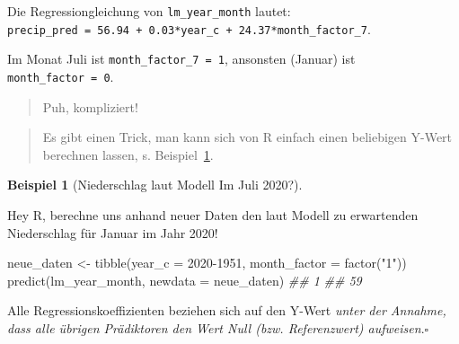 \documentclass[
  letterpaper,
]{scrbook}
\newenvironment{Shaded}{\begin{snugshade}}{\end{snugshade}}
\newcommand{\AttributeTok}[1]{\textcolor[rgb]{0.40,0.45,0.13}{#1}}
\newcommand{\DecValTok}[1]{\textcolor[rgb]{0.68,0.00,0.00}{#1}}
\newcommand{\DocumentationTok}[1]{\textcolor[rgb]{0.37,0.37,0.37}{\textit{#1}}}
\newcommand{\FunctionTok}[1]{\textcolor[rgb]{0.28,0.35,0.67}{#1}}
\newcommand{\NormalTok}[1]{\textcolor[rgb]{0.00,0.23,0.31}{#1}}
\newcommand{\OtherTok}[1]{\textcolor[rgb]{0.00,0.23,0.31}{#1}}
\newcommand{\StringTok}[1]{\textcolor[rgb]{0.13,0.47,0.30}{#1}}
\theoremstyle{definition}
\newtheorem{example}{Beispiel}[chapter]
\theoremstyle{definition}
\theoremstyle{definition}
\theoremstyle{remark}
\begin{document}
Die Regressiongleichung von \texttt{lm\_year\_month} lautet:
\texttt{precip\_pred\ =\ 56.94\ +\ 0.03*year\_c\ +\ 24.37*month\_factor\_7}.

Im Monat Juli ist \texttt{month\_factor\_7\ =\ 1}, ansonsten (Januar)
ist \texttt{month\_factor\ =\ 0}.

\begin{quote}
{} Puh, kompliziert!
\end{quote}

\begin{quote}
{} Es gibt einen Trick, man kann sich von R einfach einen
beliebigen Y-Wert berechnen lassen, s. Beispiel~\ref{exm-niederschlag1}.
\end{quote}

\begin{example}[Niederschlag laut Modell Im Juli
2020?]\protect\hypertarget{exm-niederschlag1}{}\label{exm-niederschlag1}

Hey R, berechne uns anhand neuer Daten den laut Modell zu erwartenden
Niederschlag für Januar im Jahr 2020!

\begin{Shaded}
\begin{Highlighting}[]
\NormalTok{neue\_daten }\OtherTok{\textless{}{-}} \FunctionTok{tibble}\NormalTok{(}\AttributeTok{year\_c =} \DecValTok{2020{-}1951}\NormalTok{,}
                     \AttributeTok{month\_factor =} \FunctionTok{factor}\NormalTok{(}\StringTok{"1"}\NormalTok{))}
\FunctionTok{predict}\NormalTok{(lm\_year\_month, }\AttributeTok{newdata =}\NormalTok{ neue\_daten)}
\DocumentationTok{\#\#  1 }
\DocumentationTok{\#\# 59}
\end{Highlighting}
\end{Shaded}

\end{example}

\begin{tcolorbox}[enhanced jigsaw, colbacktitle=quarto-callout-note-color!10!white, coltitle=black, bottomrule=.15mm, rightrule=.15mm, arc=.35mm, toptitle=1mm, colframe=quarto-callout-note-color-frame, opacitybacktitle=0.6, left=2mm, leftrule=.75mm, breakable, opacityback=0, bottomtitle=1mm, titlerule=0mm, title=\textcolor{quarto-callout-note-color}{\faInfo}\hspace{0.5em}{Hinweis}, colback=white, toprule=.15mm]

Alle Regressionskoeffizienten beziehen sich auf den Y-Wert \emph{unter
der Annahme, dass alle übrigen Prädiktoren den Wert Null (bzw.
Referenzwert) aufweisen}.\(\square\)

\end{tcolorbox}
\end{document}
